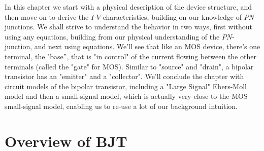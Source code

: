 In this chapter we start with a physical description of the device structure, and then move on to derive the $I$-$V$ characteristics, building on our knowledge of $PN$-junctions. We shall strive to understand the behavior in two ways, first without using any equations, building from our physical understanding of the $PN$-junction, and next using equations.  We'll see that like an MOS device, there's one terminal, the "base'', that is "in control" of the current flowing between the other terminals (called the "gate" for MOS).  Similar to "source" and "drain", a bipolar transistor has an "emitter" and a "collector".   We'll conclude the chapter with circuit models of the bipolar transistor, including a "Large Signal" Ebers-Moll model and then a small-signal model, which is actually very close to the MOS small-signal model, enabling us to re-use a lot of our background intuition.
\newpage
\section{Overview of BJT}
